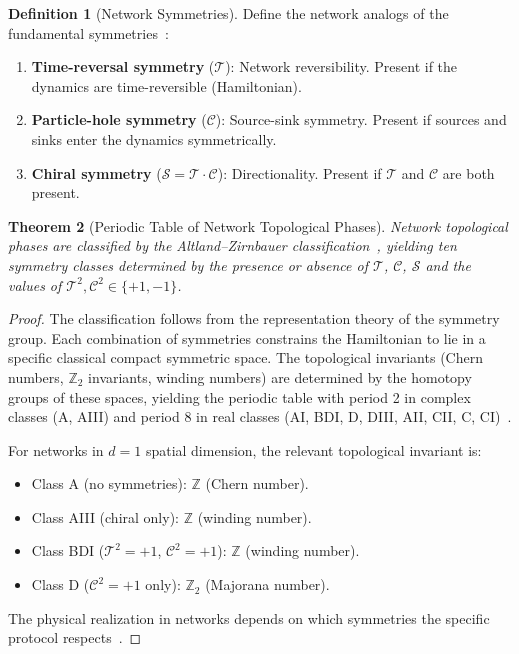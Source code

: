\documentclass[11pt,twocolumn,a4paper]{article}
\newtheorem{theorem}{Theorem}[section]
\theoremstyle{definition}
\newtheorem{definition}[theorem]{Definition}
\newcommand{\Z}{\mathbb{Z}}
\begin{document}
\begin{definition}[Network Symmetries]\label{def:network_symmetries}
Define the network analogs of the fundamental symmetries~\cite{altland1997}:
\begin{enumerate}[label=(\roman*)]
  \item \textbf{Time-reversal symmetry} ($\mathcal{T}$): Network reversibility.
        Present if the dynamics are time-reversible (Hamiltonian).
  \item \textbf{Particle-hole symmetry} ($\mathcal{C}$): Source-sink symmetry.
        Present if sources and sinks enter the dynamics symmetrically.
  \item \textbf{Chiral symmetry} ($\mathcal{S} = \mathcal{T} \cdot \mathcal{C}$):
        Directionality. Present if $\mathcal{T}$ and $\mathcal{C}$ are both present.
\end{enumerate}
\end{definition}

\begin{theorem}[Periodic Table of Network Topological Phases]\label{thm:periodic_table}
Network topological phases are classified by the Altland--Zirnbauer
classification~\cite{altland1997}, yielding ten symmetry classes determined by the
presence or absence of $\mathcal{T}$, $\mathcal{C}$, $\mathcal{S}$ and the values of
$\mathcal{T}^2, \mathcal{C}^2 \in \{+1, -1\}$.
\end{theorem}

\begin{proof}
The classification follows from the representation theory of the symmetry group. Each
combination of symmetries constrains the Hamiltonian to lie in a specific classical
compact symmetric space. The topological invariants (Chern numbers, $\Z_2$ invariants,
winding numbers) are determined by the homotopy groups of these spaces, yielding the
periodic table with period 2 in complex classes (A, AIII) and period 8 in real classes
(AI, BDI, D, DIII, AII, CII, C, CI)~\cite{altland1997,hasan2010}.

For networks in $d = 1$ spatial dimension, the relevant topological invariant is:
\begin{itemize}
  \item Class A (no symmetries): $\Z$ (Chern number).
  \item Class AIII (chiral only): $\Z$ (winding number).
  \item Class BDI ($\mathcal{T}^2 = +1$, $\mathcal{C}^2 = +1$): $\Z$ (winding number).
  \item Class D ($\mathcal{C}^2 = +1$ only): $\Z_2$ (Majorana number).
\end{itemize}
The physical realization in networks depends on which symmetries the specific protocol
respects~\cite{sachikonye2024a}.
\end{proof}
\end{document}
